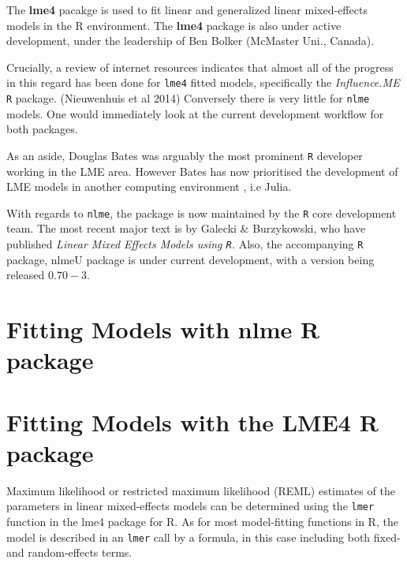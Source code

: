 \documentclass[Main.tex]{subfiles}
\begin{document}

The \textbf{lme4} pacakge is used to fit linear and generalized linear mixed-effects models in the R environment.
The \textbf{lme4} package is also under active development, under the leadership of Ben Bolker (McMaster Uni., Canada).


Crucially, a review of internet resources indicates that almost all of the progress in this regard has been done for \texttt{lme4} fitted models, specifically the \textit{Influence.ME} \texttt{R} package. (Nieuwenhuis et al 2014)
Conversely there is very little for \texttt{nlme} models. One would immediately look at the current development workflow for both packages.


As an aside, Douglas Bates was arguably the most prominent \texttt{R} developer working in the LME area. 
However Bates has now prioritised the development of LME models in another computing environment , i.e Julia. 


With regards to \texttt{nlme}, the package is now maintained by the \texttt{R} core development team. The most recent major text is by Galecki \& Burzykowski, who have published \textit{ Linear Mixed Effects Models using \texttt{R}. }
Also, the accompanying \texttt{R} package, nlmeU package is under current development, with a version being released $0.70-3$.


\section{Fitting Models with nlme R package}

\section{Fitting Models with the LME4 R package}
Maximum likelihood or restricted maximum likelihood (REML) estimates of the parameters in linear mixed-effects models can be determined using the \texttt{lmer} function in the lme4 package for R. As for most model-fitting functions in R, the model is described in an \texttt{lmer} call by a formula, in this case including both fixed- and random-effects terms. 
\end{document}
